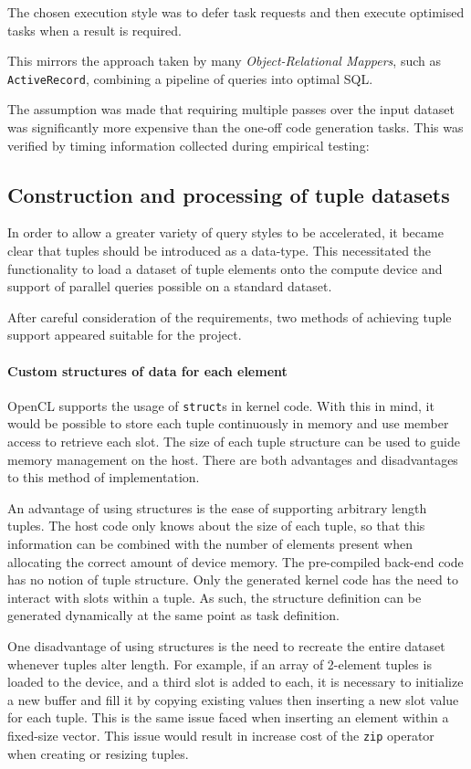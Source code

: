 The chosen execution style was to defer task requests and then execute optimised tasks when a result is required.

This mirrors the approach taken by many \emph{Object-Relational Mappers}, such as \verb|ActiveRecord|, combining a pipeline of queries into optimal SQL.

The assumption was made that requiring multiple passes over the input dataset was significantly more expensive than the one-off code generation tasks. This was verified by timing information collected during empirical testing:

\subsection{Construction and processing of tuple datasets}
In order to allow a greater variety of query styles to be accelerated, it became clear that tuples should be introduced as a data-type. This necessitated the functionality to load a dataset of tuple elements onto the compute device and support of parallel queries possible on a standard dataset.

After careful consideration of the requirements, two methods of achieving tuple support appeared suitable for the project.

\paragraph*{Custom structures of data for each element} \ac{OpenCL} supports the usage of \verb|struct|s in kernel code. With this in mind, it would be possible to store each tuple continuously in memory and use member access to retrieve each slot. The size of each tuple structure can be used to guide memory management on the host. There are both advantages and disadvantages to this method of implementation. 

An advantage of using structures is the ease of supporting arbitrary length tuples. The host code only knows about the size of each tuple, so that this information can be combined with the number of elements present when allocating the correct amount of device memory. The pre-compiled back-end code has no notion of tuple structure. Only the generated kernel code has the need to interact with slots within a tuple. As such, the structure definition can be generated dynamically at the same point as task definition. 

One disadvantage of using structures is the need to recreate the entire dataset whenever tuples alter length. For example, if an array of 2-element tuples is loaded to the device, and a third slot is added to each, it is necessary to initialize a new buffer and fill it by copying existing values then inserting a new slot value for each tuple. This is the same issue faced when inserting an element within a fixed-size vector. This issue would result in increase cost of the \verb|zip| operator when creating or resizing tuples.


